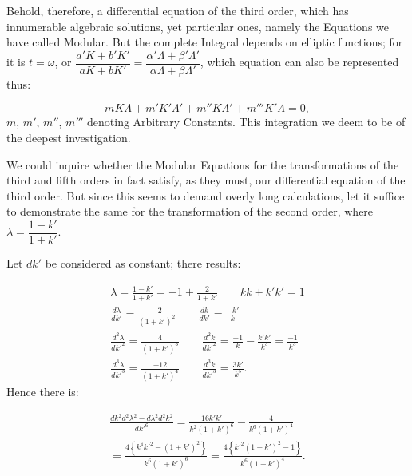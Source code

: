 \documentclass{article}
\begin{document}
Behold, therefore, a differential equation of the third order, which has innumerable algebraic solutions, yet particular ones, namely the Equations we have called Modular. But the complete Integral depends on elliptic functions; for it is $t=\omega$, or $\dfrac{a'K+b'K'}{aK+bK'}=\dfrac{\alpha'\Lambda+\beta'\Lambda'}{\alpha\Lambda+\beta\Lambda'}$, which equation can also be represented thus:

\[
mK\Lambda+m'K'\Lambda'+m''K\Lambda'+m'''K'\Lambda=0,
\]
$m$, $m'$, $m''$, $m'''$ denoting Arbitrary Constants. This integration we deem to be of the deepest investigation.


We could inquire whether the Modular Equations for the transformations of the third and fifth orders in fact satisfy, as they must, our differential equation of the third order. But since this seems to demand overly long calculations, let it suffice to demonstrate the same for the transformation of the second order, where $\lambda=\dfrac{1-k'}{1+k'}$.

Let $dk'$ be considered as constant; there results:

\[
\begin{gathered}
\lambda=\frac{1-k'}{1+k'}=-1+\frac{2}{1+k'}\qquad kk+k'k'=1\\[1.5ex]
\frac{d\lambda}{dk'}=\frac{-2}{(1+k')^{2}}\qquad\frac{dk}{dk'}=\frac{-k'}{k}\\[1.5ex]
\frac{d^{2}\lambda}{dk'^{2}}=\frac{4}{(1+k')^{3}}\qquad\frac{d^{2}k}{dk'^{2}}=\frac{-1}{k}-\frac{k'k'}{k^{3}}=\frac{-1}{k^{3}}\\[1.5ex]
\frac{d^{3}\lambda}{dk'^{3}}=\frac{-12}{(1+k')^{4}}\qquad\frac{d^{3}k}{dk'^{3}}=\frac{3k'}{k^{5}}.
\end{gathered}
\]
Hence there is:

\[
\begin{gathered}
\frac{dk^{2}d^{2}\lambda^{2}-d\lambda^{2}d^{2}k^{2}}{dk'^{6}}=\frac{16k'k'}{k^{2}(1+k')^{6}}-\frac{4}{k^{6}(1+k')^{4}}\\[1.5ex]
=\frac{4\left\{k^{4}k'^{2}-(1+k')^{2}\right\}}{k^{6}(1+k')^{6}}=\frac{4\left\{k'^{2}(1-k')^{2}-1\right\}}{k^{6}(1+k')^{4}}.
\end{gathered}
\]
\end{document}
